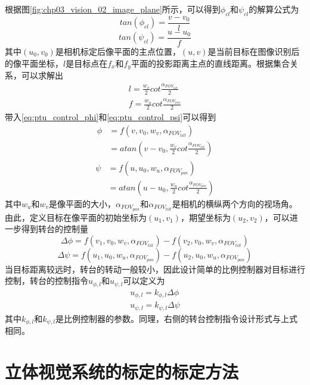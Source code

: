 根据图\ref{fig:chp03_vision_02_image_plane}所示，可以得到$\phi_{cl}$和$\psi_{cl}$的解算公式为
\begin{equation}
\label{eq:ptu_control_phi}
tan(\phi_{cl})=\frac{v-v_0}{l}
\end{equation}
\begin{equation}
\label{eq:ptu_control_psi}
tan(\psi_{cl})=\frac{u-u_0}{f}
\end{equation}
其中$(u_0, v_0)$是相机标定后像平面的主点位置，$(u, v)$是当前目标在图像识别后的像平面坐标，$l$是目标点在$f_x$和$f_y$平面的投影距离主点的直线距离。根据集合关系，可以求解出
\begin{align}
l = \frac{w_v}{2}cot \frac{\alpha_{FOV_{tilt}}}{2} \\
f = \frac{w_u}{2}cot\frac{\alpha_{FOV_{pan}}}{2}
\end{align}
带入\ref{eq:ptu_control_phi}和\ref{eq:ptu_control_psi}可以得到
\begin{align} \label{eq:FOV_TILT}
\phi &=f(v, v_0, w_v, \alpha_{FOV_{tilt}}) \\
&=atan(v-v_0, \frac{w_v}{2}cot \frac{\alpha_{FOV_{tilt}}}{2})
\end{align}
\begin{align} \label{eq:FOV_PAN}
\psi &=f(u, u_0, w_u, \alpha_{FOV_{pan}}) \\
&=atan(u-u_0, \frac{w_u}{2}cot\frac{\alpha_{FOV_{pan}}}{2})
\end{align}
其中$w_u$和$w_v$是像平面的大小，$\alpha_{FOV_{pan}}$和$\alpha_{FOV_{tilt}}$是相机的横纵两个方向的视场角。由此，定义目标在像平面的初始坐标为$(u_1, v_1)$，期望坐标为$(u_2, v_2)$，可以进一步得到转台的控制量
\begin{equation}
\Delta\phi=f(v_1,v_0,w_v, \alpha_{FOV_{tilt}})-f(v_2,v_0, w_v, \alpha_{FOV_{tilt}})
\end{equation}
\begin{equation}
\Delta\psi=f(u_1,u_0,w_u, \alpha_{FOV_{pan}})-f(u_2,u_0, w_u, \alpha_{FOV_{pan}})
\end{equation}
当目标距离较远时，转台的转动一般较小，因此设计简单的比例控制器对目标进行控制，转台的控制指令$u_{\phi,l}$和$u_{\psi,l}$可以定义为
\begin{align}
u_{\phi,l} = k_{\phi,l}\Delta\phi\\
u_{\psi,l} = k_{\psi,l}\Delta\psi
\end{align}
其中$k_{\phi,l}$和$k_{\psi,l}$是比例控制器的参数。同理，右侧的转台控制指令设计形式与上式相同。

\section{立体视觉系统的标定的标定方法}
